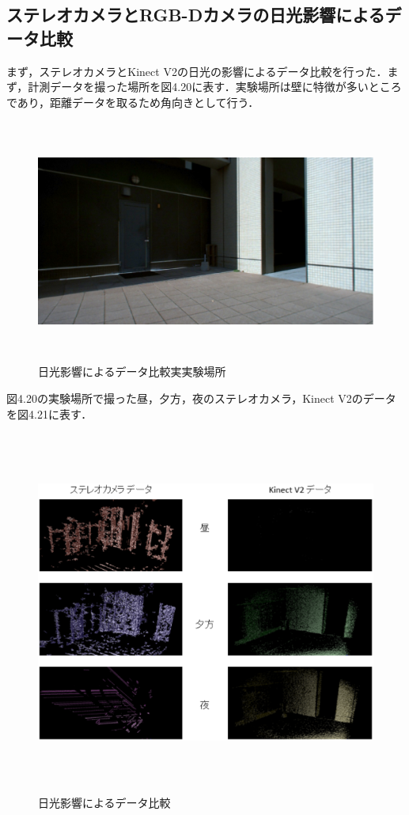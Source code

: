 \subsection{ステレオカメラとRGB-Dカメラの日光影響によるデータ比較}
まず，ステレオカメラとKinect V2の日光の影響によるデータ比較を行った．まず，計測データを撮った場所を図4.20に表す．実験場所は壁に特徴が多いところであり，距離データを取るため角向きとして行う．

%
\begin{figure}[htbp]
  \begin{center}
   \includegraphics[height=80mm]{figure/日光影響によるデータ比較実実験場所.eps}
   \caption{日光影響によるデータ比較実実験場所}
   \label{日光影響によるデータ比較実実験場所}
  \end{center}
\end{figure}
%

\newpage

図4.20の実験場所で撮った昼，夕方，夜のステレオカメラ，Kinect V2のデータを図4.21に表す．

%
\begin{figure}[htbp]
  \begin{center}
   \includegraphics[height=120mm]{figure/日光影響によるデータ比較.eps}
   \caption{日光影響によるデータ比較}
   \label{日光影響によるデータ比較}
  \end{center}
\end{figure}
%

